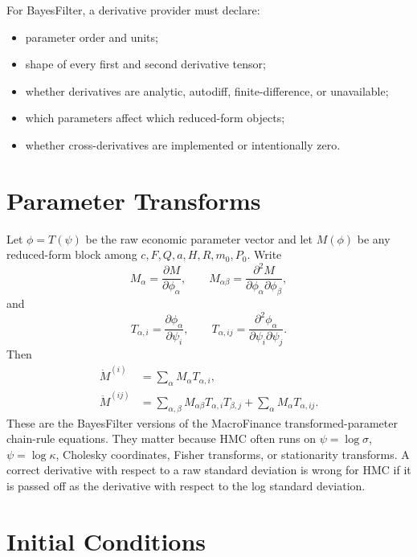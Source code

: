 For BayesFilter, a derivative provider must declare:
\begin{itemize}
  \item parameter order and units;
  \item shape of every first and second derivative tensor;
  \item whether derivatives are analytic, autodiff, finite-difference, or
    unavailable;
  \item which parameters affect which reduced-form objects;
  \item whether cross-derivatives are implemented or intentionally zero.
\end{itemize}

\section{Parameter Transforms}
\label{sec:bf-structural-parameter-transforms}

Let $\phi=T(\psi)$ be the raw economic parameter vector and let
$M(\phi)$ be any reduced-form block among $c,F,Q,a,H,R,m_0,P_0$.  Write
\[
  M_\alpha=\frac{\partial M}{\partial\phi_\alpha},
  \qquad
  M_{\alpha\beta}
  =
  \frac{\partial^2M}{\partial\phi_\alpha\partial\phi_\beta},
\]
and
\[
  T_{\alpha,i}=\frac{\partial\phi_\alpha}{\partial\psi_i},
  \qquad
  T_{\alpha,ij}
  =
  \frac{\partial^2\phi_\alpha}{\partial\psi_i\partial\psi_j}.
\]
Then
\begin{align}
\label{eq:bf-structural-transform-first}
  \dot M^{(i)}
  &=
  \sum_\alpha M_\alpha T_{\alpha,i},\\
\label{eq:bf-structural-transform-second}
  \ddot M^{(ij)}
  &=
  \sum_{\alpha,\beta}
    M_{\alpha\beta}T_{\alpha,i}T_{\beta,j}
  +\sum_\alpha M_\alpha T_{\alpha,ij}.
\end{align}
These are the BayesFilter versions of the MacroFinance transformed-parameter
chain-rule equations.  They matter because HMC often runs on
$\psi=\log\sigma$, $\psi=\log\kappa$, Cholesky coordinates, Fisher transforms,
or stationarity transforms.  A correct derivative with respect to a raw standard
deviation is wrong for HMC if it is passed off as the derivative with respect to
the log standard deviation.

\section{Initial Conditions}
\label{sec:bf-structural-initial-conditions}

